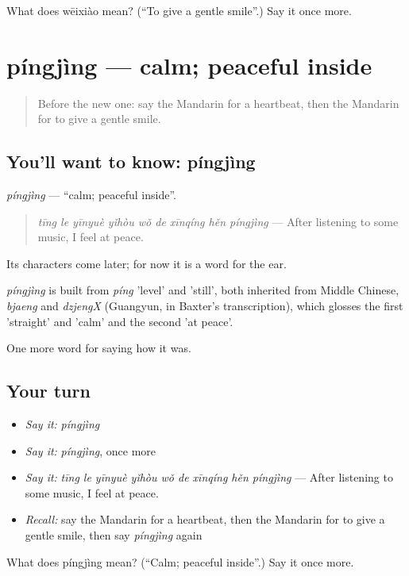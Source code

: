 \begin{tcolorbox}[breakable,colback=teal!4,colframe=teal!35!black,title={Before you move on}]
What does wēixiào mean? (\textquotedblleft{}To give a gentle smile\textquotedblright{}.) Say it once more.
\end{tcolorbox}
\section[píngjìng]{píngjìng — calm; peaceful inside}

\label{lesson:ZH-C466-pingjing}



\begin{quote}
Before the new one: say the Mandarin for a heartbeat, then the Mandarin for to give a gentle smile.
\end{quote}

\subsection*{You'll want to know: píngjìng}
\emph{píngjìng} — \textquotedblleft{}calm; peaceful inside\textquotedblright{}.

\begin{quote}
\emph{tīng le yīnyuè yǐhòu wǒ de xīnqíng hěn píngjìng} — After listening to some music, I feel at peace.
\end{quote}

Its characters come later; for now it is a word for the ear.

\begin{cousinweb}
\emph{píngjìng} is built from \emph{píng} 'level' and  'still', both inherited from Middle Chinese, \emph{bjaeng} and \emph{dzjengX} (Guangyun, in Baxter's transcription), which glosses the first 'straight' and 'calm' and the second 'at peace'.
\end{cousinweb}

\begin{grammarlens}[title={What you've built}]
One more word for saying how it was.
\end{grammarlens}

\subsection*{Your turn}
\begin{itemize}
\raggedright
  \item \emph{Say it:} \emph{píngjìng}
  \item \emph{Say it:} \emph{píngjìng}, once more
  \item \emph{Say it:} \emph{tīng le yīnyuè yǐhòu wǒ de xīnqíng hěn píngjìng} — After listening to some music, I feel at peace.
  \item \emph{Recall:} say the Mandarin for a heartbeat, then the Mandarin for to give a gentle smile, then say \emph{píngjìng} again
\end{itemize}

\begin{tcolorbox}[breakable,colback=teal!4,colframe=teal!35!black,title={Before you move on}]
What does píngjìng mean? (\textquotedblleft{}Calm; peaceful inside\textquotedblright{}.) Say it once more.
\end{tcolorbox}
